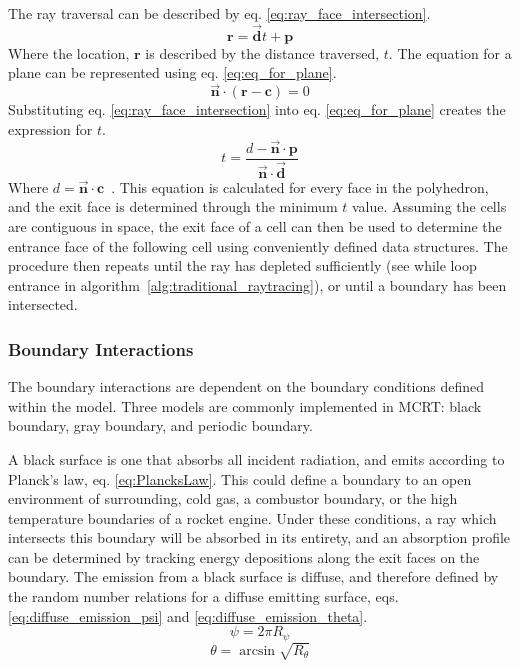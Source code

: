 The ray traversal can be described by eq. \ref{eq:ray_face_intersection}.
\begin{equation}
    \textbf{r} = \Vec{\textbf{d}}t + \textbf{p}
    \label{eq:ray_face_intersection}
\end{equation}
Where the location, $\textbf{r}$ is described by the distance traversed, $t$.
The equation for a plane can be represented using eq. \ref{eq:eq_for_plane}.
\begin{equation}
    \Vec{\textbf{n}} \cdot (\textbf{r} - \textbf{c}) = 0
    \label{eq:eq_for_plane}
\end{equation}
Substituting eq. \ref{eq:ray_face_intersection} into eq. \ref{eq:eq_for_plane} creates the expression for $t$.
\begin{equation}
    t=\frac{d-\Vec{\textbf{n}}\cdot\textbf{p}}{\Vec{\textbf{n}}\cdot\Vec{\textbf{d}}}
    \label{eq:eq_for_plane}
\end{equation}
Where $d=\Vec{\textbf{n}}\cdot\textbf{c}$~\cite{Kay1986RayScenes}. This equation is calculated for every face in the polyhedron, and the exit face is determined through the minimum $t$ value. Assuming the cells are contiguous in space, the exit face of a cell can then be used to determine the entrance face of the following cell using conveniently defined data structures.
The procedure then repeats until the ray has depleted sufficiently (see while loop entrance in algorithm~\ref{alg:traditional_raytracing}), or until a boundary has been intersected.

\subsubsection{Boundary Interactions}
The boundary interactions are dependent on the boundary conditions defined within the model. Three models are commonly implemented in MCRT: black boundary, gray boundary, and periodic boundary.

A black surface is one that absorbs all incident radiation, and emits according to Planck's law, eq. \ref{eq:PlancksLaw}. 
This could define a boundary to an open environment of surrounding, cold gas, a combustor boundary, or the high temperature boundaries of a rocket engine. 
Under these conditions, a ray which intersects this boundary will be absorbed in its entirety, and an absorption profile can be determined by tracking energy depositions along the exit faces on the boundary. The emission from a black surface is diffuse, and therefore defined by the random number relations for a diffuse emitting surface, eqs. \ref{eq:diffuse_emission_psi} and \ref{eq:diffuse_emission_theta}.
\begin{equation}
    \psi{}=2\pi{}R_\psi
    \label{eq:diffuse_emission_psi}
\end{equation}
\begin{equation}
    \theta = \arcsin{\sqrt{R_\theta}}
    \label{eq:diffuse_emission_theta}
\end{equation}


